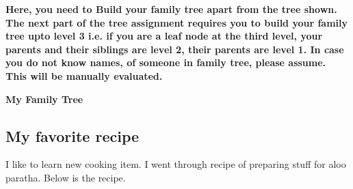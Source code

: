 \documentclass{article}
\begin{document}
            \par \textbf{ Here, you need to Build your family tree apart from the tree shown. The next part of the tree assignment requires you to build your family tree upto level 3 i.e. if you are a leaf node at the third level, your parents and their siblings are level 2, their parents are level 1. In case you do not know names, of someone in family tree, please assume. This will be manually evaluated.}
             \begin{center}
            
            \begin{center}
               \textbf{ My Family Tree}
            \end{center}
    
            \end{center}
            \subsection{My favorite recipe}
            
            I like to learn new cooking item. I went through recipe of preparing stuff for aloo paratha. Below is the recipe.
        
        \newpage
            
\end{document}
